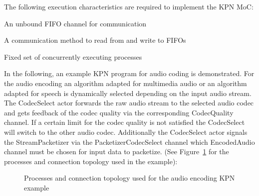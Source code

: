 
The following execution characteristics are required to
implement the KPN MoC:

\begin{characteristic}\label{characteristic-kpn-fifo}
  An unbound FIFO channel for communication
\end{characteristic}

\begin{characteristic}\label{characteristic-kpn-fifo-read-write}
  A communication method to read from and write to FIFOs
\end{characteristic}

\begin{characteristic}\label{characteristic-kpn-concurrent-processes}
  Fixed set of concurrently executing processes
\end{characteristic}

In the following, an example KPN program for audio coding
is demonstrated. For the audio encoding an algorithm
adapted for multimedia audio or an algorithm adapted for speech
is dynamically selected depending on the input audio stream.
The CodecSelect actor forwards the raw audio stream to the
selected audio codec and gets feedback of the codec quality
via the corresponding CodecQuality channel. If a certain
limit for the codec quality is not satisfied the CodecSelect will
switch to the other audio codec. Additionally the CodecSelect actor
signals the StreamPacketizer via the PacketizerCodecSelect channel
which EncodedAudio channel must be chosen for input data to packetize.
(See Figure~\ref{fig:media-speech-audio-coding}
for the processes and connection topology used in the example):

\begin{figure}[h]
\centering

\caption{Processes and connection topology used for the audio encoding KPN example}
\label{fig:media-speech-audio-coding}
\end{figure}

